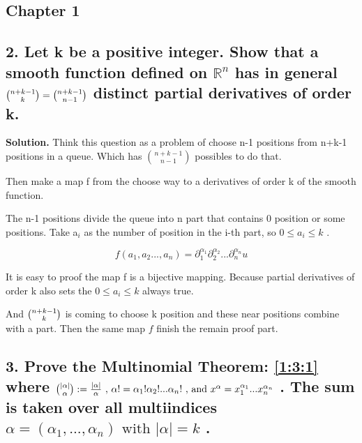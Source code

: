\documentclass[a4paper]{book}
\newenvironment{solution}%
{\noindent\textbf{Solution.}}%
{\qedhere}
\numberwithin{equation}{chapter}
\theoremstyle{definition}
\begin{document}
\begin{multicols}{2}
\setlength{\columnseprule}{0.2pt}  

\section{Chapter 1}
\subsection{2. Let k be a positive integer. Show that a smooth function defined on $\mathbb{R}^n$ has in general 
$%
	\tbinom{n+k-1}{k} = \tbinom{n+k-1}{n-1}
$
distinct partial derivatives of order k.}

\begin{solution}
	Think this question as a problem of choose n-1 positions from n+k-1 positions in a queue. Which has $\binom{n+k-1}{n-1}$ possibles to do that.
	
	Then make a map f from the choose way to a derivatives of order k of the smooth function.
	
	The n-1 positions divide the queue into n part that contains 0 position or some positions. Take a$_{i}$ as the number of position in the i-th part, so $0 \leq a_{i} \leq k$ .
	
	$$f(a_1, a_2 ..., a_n) = \partial_{1}^{\alpha_{1}}\partial_{2}^{\alpha_{2}}...\partial_{n}^{\alpha_{n}}u $$
	
	It is easy to proof the map f is a bijective mapping. Because partial derivatives of order k also sets the $0 \leq a_{i} \leq k$ always true.
	
	And $\tbinom{n+k-1}{k}$ is coming to choose k position and these near positions combine with a part. Then the same map $f$ finish the remain proof part.  
\end{solution}

\subsection{3. Prove the Multinomial Theorem: \ref{1:3:1} where $ \tbinom{|\alpha|}{\alpha} := \frac{|\alpha|}{\alpha} \text{ , } \alpha ! = \alpha_1 ! \alpha_2 ! ... \alpha_n ! \text{ , and } x^\alpha = x_1^{\alpha_1} ... x_n^{\alpha_n}$ . The sum is taken over all multiindices $\alpha = (\alpha_1, ... ,\alpha_n) \text{ with } |\alpha | = k $ .}


\end{multicols}
\end{document}
